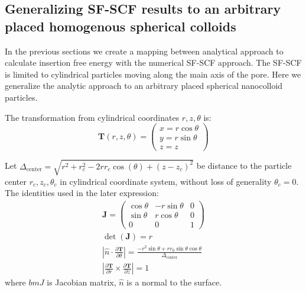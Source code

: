 \documentclass[10pt, a4paper]{article}
\newcommand\todo[1]{\textcolor{red}{#1}}
\begin{document}
\subsection*{Generalizing SF-SCF results to an arbitrary placed homogenous spherical colloids}
\begin{multicols}{2}

In the previous sections we create a mapping between analytical approach to calculate insertion free energy with the numerical SF-SCF approach. The SF-SCF is limited to cylindrical particles moving along the main axis of the pore.
Here we generalize the analytic approach to an arbitrary placed spherical nanocolloid particles.



The transformation from cylindrical coordinates $r, z, \theta$ is:
\begin{equation}
    \bm{T}(r, z, \theta) = 
    \begin{pmatrix}
        x = r \cos \theta\\
        y = r \sin \theta\\
        z = z
    \end{pmatrix}
\end{equation}

Let $\Delta_{\textrm{center}} = \sqrt{r^2 + r_c^2 - 2 r r_c \cos(\theta) + (z-z_c)^2}$ be distance to the particle center $r_c, z_c, \theta_c$ in cylindrical coordinate system, without loss of generality $\theta_c = 0$.
The identities used in the later expression:
\begin{gather}
    \bm{J} = 
    \begin{pmatrix}
        \cos{\theta} & -r\sin\theta & 0 \\
        \sin{\theta} &  r\cos\theta & 0 \\
        0           & 0            & 1
    \end{pmatrix}\\
    \det(\bm{J}) = r \\
    \left| \hat{n} \cdot \frac{\partial \bm{T}}{\partial \theta} \right| = \frac{-r^2 \sin \theta + rr_0 \sin \theta \cos \theta}{\Delta_{\textrm{center}}}\\
    \left| \frac{\partial \bm{T}}{\partial r} \times \frac{\partial \bm{T}}{\partial z} \right| = 1
\end{gather}
where $bm{J}$ is Jacobian matrix, $\hat{n}$ is a normal to the surface.


\end{multicols}
\end{document}
